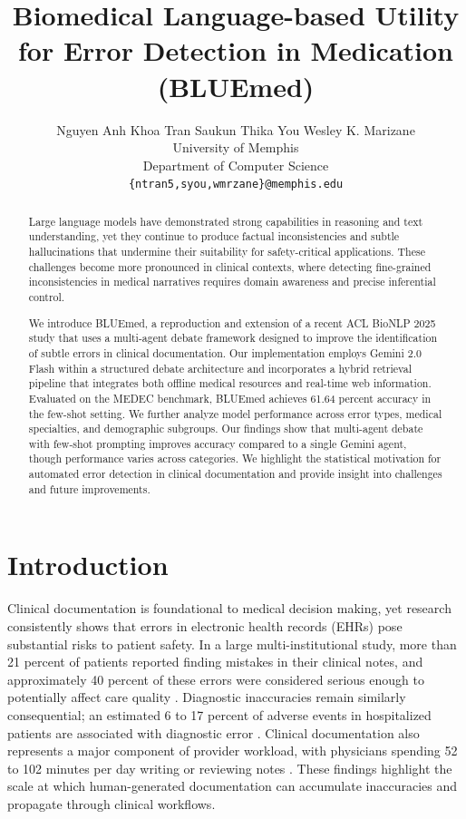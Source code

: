 \documentclass[11pt]{article}
\title{Biomedical Language-based Utility for Error Detection in Medication (BLUEmed)}
\author{
Nguyen Anh Khoa Tran \quad
Saukun Thika You \quad
Wesley K. Marizane \\
University of Memphis \\
Department of Computer Science \\
\texttt{\{ntran5,syou,wmrzane\}@memphis.edu}
}
\begin{document}
\maketitle
\begin{abstract}
Large language models have demonstrated strong capabilities in reasoning and text understanding, yet they continue to produce factual inconsistencies and subtle hallucinations that undermine their suitability for safety-critical applications. These challenges become more pronounced in clinical contexts, where detecting fine-grained inconsistencies in medical narratives requires domain awareness and precise inferential control.


We introduce BLUEmed, a reproduction and extension of a recent ACL BioNLP 2025 study that uses a multi-agent debate framework designed to improve the identification of subtle errors in clinical documentation. Our implementation employs Gemini 2.0 Flash within a structured debate architecture and incorporates a hybrid retrieval pipeline that integrates both offline medical resources and real-time web information. Evaluated on the MEDEC benchmark, BLUEmed achieves 61.64 percent accuracy in the few-shot setting. We further analyze model performance across error types, medical specialties, and demographic subgroups. Our findings show that multi-agent debate with few-shot prompting improves accuracy compared to a single Gemini agent, though performance varies across categories. We highlight the statistical motivation for automated error detection in clinical documentation and provide insight into challenges and future improvements.
\end{abstract}


\section{Introduction}

Clinical documentation is foundational to medical decision making, yet research consistently shows that errors in electronic health records (EHRs) pose substantial risks to patient safety. In a large multi-institutional study, more than 21 percent of patients reported finding mistakes in their clinical notes, and approximately 40 percent of these errors were considered serious enough to potentially affect care quality \citep{bell2020}. Diagnostic inaccuracies remain similarly consequential; an estimated 6 to 17 percent of adverse events in hospitalized patients are associated with diagnostic error \citep{bell2020}. 
Clinical documentation also represents a major component of provider workload, with physicians spending 52 to 102 minutes per day writing or reviewing notes \citep{hripcsak2011}. These findings highlight the scale at which human-generated documentation can accumulate inaccuracies and propagate through clinical workflows.
\end{document}
